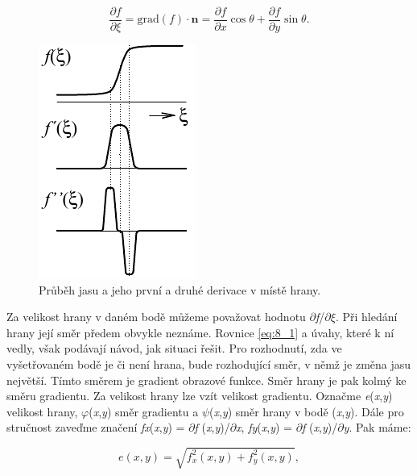 \begin{equation} \label{eq:8_1}
    \frac{\partial f}{\partial \xi} = \mathrm{grad} (f) \cdot \mathbf{n} = \frac{\partial f}{\partial x} \cos \theta + \frac{\partial f}{\partial y} \sin \theta .
\end{equation}

\begin{figure}[th]
    \begin{center}
        \includegraphics[scale=1.0]{08_segmentace/images/img_8_2.pdf}
    \end{center}
    \caption{Průběh jasu a jeho první a druhé derivace v místě hrany.}
    \label{img:8_2}
\end{figure}

Za velikost hrany v daném bodě můžeme považovat hodnotu \textbar $\partial$\textit{f}/$\partial$$\xi$\textbar . Při hledání hrany její směr předem obvykle neznáme. Rovnice \eqref{eq:8_1} a úvahy, které k ní vedly, však podávají návod, jak situaci řešit. Pro rozhodnutí, zda ve vyšetřovaném bodě je či není hrana, bude rozhodující směr, v němž je změna jasu největší. Tímto směrem je gradient obrazové funkce. Směr hrany je pak kolmý ke směru gradientu. Za velikost hrany lze vzít velikost gradientu. Označme \textit{e}(\textit{x},\textit{y}) velikost hrany, $\varphi$(\textit{x},\textit{y}) směr gradientu a $\psi$(\textit{x},\textit{y}) směr hrany v bodě (\textit{x},\textit{y}). Dále pro stručnost zaveďme značení  \textit{fx}(\textit{x},\textit{y}) = $\partial$\textit{f} (\textit{x},\textit{y})/$\partial$\textit{x},  \textit{fy}(\textit{x},\textit{y}) = $\partial$\textit{f} (\textit{x},\textit{y})/$\partial$\textit{y}. Pak máme:

\begin{equation} \label{eq:8_2}
    e(x, y) = \sqrt{ f_x^2(x, y) + f_y^2(x, y)},
\end{equation}

